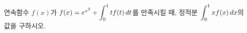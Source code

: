 연속함수 $f(x)$가 $f(x)=e^{x^2}+\displaystyle\int_{0}^{1}tf(t)\mkern3mu dt$를 만족시킬 때, 정적분 $\displaystyle\int_{0}^{1}xf(x)\mkern3mu dx$의 값을 구하시오.
